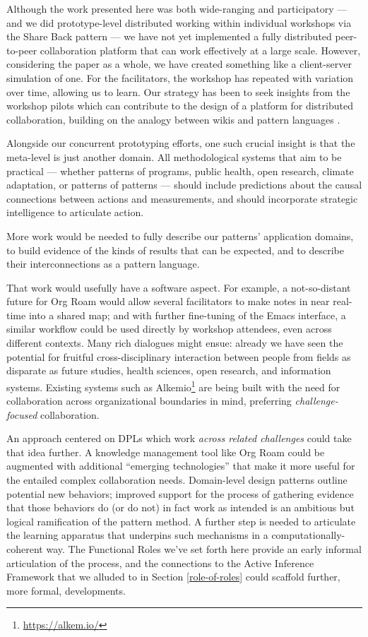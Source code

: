 \documentclass[acmlarge,timestamp]{acmart}
\begin{document}
Although the work presented here was both wide-ranging and
participatory — and we did prototype-level distributed working within
individual workshops via the {\sc Share Back} pattern — we have not
yet implemented a fully distributed peer-to-peer collaboration
platform that can work effectively at a large scale.  However,
considering the paper as a whole, we have created something like a
client-server simulation of one.  For the facilitators, the workshop
has repeated with variation over time, allowing us to learn.  Our
strategy has been to seek insights from the workshop pilots which can
contribute to the design of a platform for distributed collaboration,
building on the analogy between wikis and pattern languages
\cite{cunningham2013a}.

Alongside our concurrent prototyping efforts, one such crucial insight
is that the meta-level is just another domain.  All methodological
systems that aim to be practical — whether patterns of programs,
public health, open research, climate adaptation, or patterns of
patterns — should include predictions about the causal
connections between actions and measurements, and should incorporate
strategic intelligence to articulate action.

More work would be needed to fully describe our patterns’ application
domains, to build evidence of the kinds of results that can be
expected, and to describe their interconnections as a pattern
language.

That work would usefully have a software aspect.  For example, a
not-so-distant future for Org Roam would allow several facilitators to
make notes in near real-time into a shared map; and with further
fine-tuning of the Emacs interface, a similar workflow could be used
directly by workshop attendees, even across different contexts.  Many
rich dialogues might ensue: already we have seen the potential for
fruitful cross-disciplinary interaction between people from fields as
disparate as future studies, health sciences, open research, and
information systems.  Existing systems such as
Alkemio\footnote{\url{https://alkem.io/}} are being built with the
need for collaboration across organizational boundaries in mind,
preferring \emph{challenge-focused} collaboration.

An approach centered on DPLs which work \emph{across related
challenges} could take that idea further.  A knowledge management tool
like Org Roam could be augmented with additional “emerging
technologies” that make it more useful for the entailed complex
collaboration needs.  Domain-level design patterns outline potential
new behaviors; improved support for the process of gathering evidence
that those behaviors do (or do not) in fact work as intended is an
ambitious but logical ramification of the pattern method.  A further
step is needed to articulate the learning apparatus that underpins
such mechanisms in a computationally-coherent way.  The {\sc
  Functional Roles} we’ve set forth here provide an early informal
articulation of the process, and the connections to the Active
Inference Framework that we alluded to in Section \ref{role-of-roles}
could scaffold further, more formal, developments.
\end{document}
